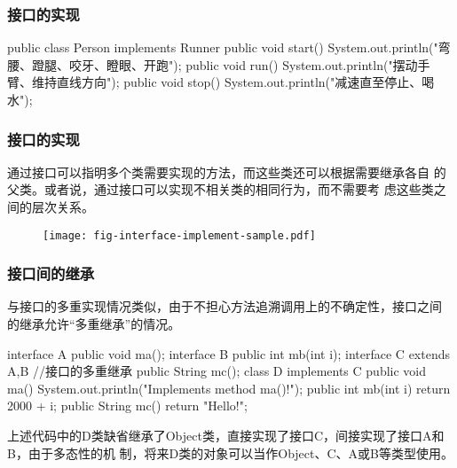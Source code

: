\begin{frame}[fragile] %
  \frametitle{接口的实现}


  \begin{javaCode}
    public class Person implements Runner {
      public void start() {
        System.out.println("弯腰、蹬腿、咬牙、瞪眼、开跑");
      }
      public void run(){
        System.out.println("摆动手臂、维持直线方向");
      }
      public void stop(){
        System.out.println("减速直至停止、喝水");
      }
    }
  \end{javaCode}
\end{frame}

\begin{frame}[fragile] %
  \frametitle{接口的实现}

  通过接口可以指明多个类需要实现的方法，而这些类还可以根据需要继承各自
  的父类。或者说，{\Red\kai 通过接口可以实现不相关类的相同行为，而不需要考
    虑这些类之间的层次关系。}
  
  \begin{figure}
    \centering
    \texttt{[image: fig-interface-implement-sample.pdf]}
  \end{figure}



\end{frame}


\begin{frame}[fragile] %
\frametitle{接口间的继承}

与接口的多重实现情况类似，由于不担心方法追溯调用上的不确定性，接口之间
的继承允许“多重继承”的情况。

\begin{javaCode}
interface A {
  public void ma();
}
interface B {
  public int mb(int i);
}
interface C extends A,B {  //接口的多重继承
  public String mc();
}
class D implements C {
  public void ma() {
    System.out.println("Implements method ma()!");
  }
  public int mb(int i) {
    return 2000 + i;
  }
  public String mc() {
    return "Hello!";
  }
}
\end{javaCode}
{\footnotesize \Mage 上述代码中的D类缺省继承了Object类，直接实现了接口C，间接实现了接口A和B，由于多态性的机
制，将来D类的对象可以当作Object、C、A或B等类型使用。}
\end{frame}

